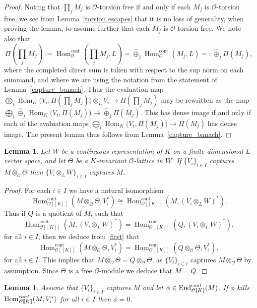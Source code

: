 \documentclass[11pt]{article}
\let\mathcal\mathscr
\newtheorem{lem}[prop]{Lemma}
\theoremstyle{definition}
\DeclareMathOperator{\End}{End}
\DeclareMathOperator{\Hom}{Hom}
\newcommand{\br}[1]{[\![#1]\!]}
\newcommand{\cO}{\mathcal{O}}
\newcommand{\cont}{\mathrm{cont}}
\begin{document}
\begin{proof}
Noting that $\prod_j M_j$ is $\cO$-torsion free if and only if each
$M_j$ is $\cO$-torsion free, we see from Lemma~\ref{torsion escapes}
that it is no loss of generality, when proving the lemma, to assume
further that each $M_j$ is $\cO$-torsion free. We note also that
\[\textstyle
\Pi(\prod_j M_j) := \Hom^{\cont}_{\cO}(\prod_j M_j, L) = \widehat{\oplus}_j
\Hom^{\cont}_{\cO}(M_j, L) =: \widehat{\oplus}_j \Pi(M_j),
\]
where the completed direct sum is taken with respect to the sup norm on
each summand, and where we are using the notation from the statement
of Lemma~\ref{capture_banach}.
Thus the evaluation map
$\bigoplus_i \Hom_K\bigl(V_i, \Pi(\prod_j M_j )\bigr) \otimes_L V_i
\to \Pi(\prod_j M_j)$
may be rewritten as the map
$\bigoplus_i \widehat{\oplus}_j \Hom_K\bigl(V_i, \Pi(M_j)\bigr)
\to \widehat{\oplus}_j \Pi(M_j).$
This has dense image if and only if each of the evaluation maps
$\bigoplus_i \Hom_K\bigl(V_i, \Pi(M_j)\bigr) \to \Pi(M_j)$
has dense image. The present lemma thus follows from
Lemma~\ref{capture_banach}.
\end{proof}

\begin{lem}\label{weight} Let $W$ be a continuous representation of $K$ on a finite dimensional $L$\nobreakdash-vector space, and let $\Theta$ be a $K$-invariant $\cO$-lattice in $W$.
If $\{V_i\}_{i\in I}$ captures $M\otimes_{\cO} \Theta$ then $\{V_i\otimes_L W\}_{i\in I}$ captures $M$.
\end{lem}

\begin{proof} For each $i\in I$ we have a natural isomorphism
\begin{equation}\label{first}
\Hom_{\cO\br{K}}^{\cont}(M\otimes_{\cO} \Theta, V_i^*)\cong \Hom_{\cO\br{K}}^{\cont}(M, (V_i\otimes_L W)^*).
\end{equation}
Thus if $Q$ is a quotient of $M$, such that
\[
\Hom_{\cO\br{K}}^{\cont}(M, (V_i\otimes_L W)^*)=\Hom_{\cO\br{K}}^{\cont}(Q, (V_i\otimes_L W)^*),
\]
for all $i\in I$, then we deduce from
\eqref{first} that
\[
\Hom_{\cO\br{K}}^{\cont}(M\otimes_{\cO} \Theta, V_i^*)=\Hom_{\cO\br{K}}^{\cont}(Q\otimes_{\cO} \Theta, V_i^*),
\]
for all $i\in I$. This implies that
$M\otimes_{\cO} \Theta= Q\otimes_{\cO} \Theta$, as $\{V_i\}_{i\in I}$ captures $M\otimes_{\cO} \Theta$ by assumption. Since $\Theta$ is a free $\cO$-module we deduce that
$M=Q$.
\end{proof}

\begin{lem}\label{faithful} Assume that $\{ V_i\}_{i\in I}$ captures $M$ and let $\phi\in \End_{\cO\br{K}}^{\rm cont}(M)$. If $\phi$ kills
$\Hom_{\cO\br{K}}^{\rm cont}(M, V_i^*)$ for all $i\in I$ then $\phi=0$.
\end{lem}
\end{document}
